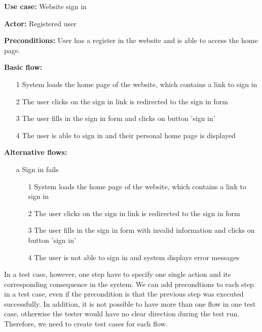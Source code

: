 \textbf{Use case:} Website sign in

\textbf{Actor:} Registered user

\textbf{Preconditions:} User has a register in the website and is able to access the home page. 

\textbf{Basic flow:}

\begin{itemize}

\item[1] System loads the home page of the website, which contains a link to sign in

\item[2] The user clicks on the sign in link is redirected to the sign in form

\item[3] The user fills in the sign in form and clicks on button 'sign in'

\item[4] The user is able to sign in and their personal home page is displayed
\end{itemize}

\textbf{Alternative flows:}

\begin{itemize}

\item[a] Sign in fails

\begin{itemize}

\item[1] System loads the home page of the website, which contains a link to sign in

\item[2] The user clicks on the sign in link is redirected to the sign in form

\item[3] The user fills in the sign in form with invalid information and clicks on button 'sign in'

\item[4] The user is not able to sign in and system displays error messages
\end{itemize} 
\end{itemize}

In a test case, however, one step have to specify one single action and its corresponding consequence in the system. We can add precondtions to each step in a test case, even if the precondition is that the previous step was executed successfully. In addition, it is not possible to have more than one flow in one test case, otherwise the tester would have no clear direction during the test run. Therefore, we need to create test cases for each flow.

